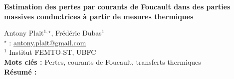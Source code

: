 


    \newpage


%
\begin{flushleft}
\addtocounter{section}{1}
{\Large \textbf{Estimation des pertes par courants de Foucault dans des parties massives conductrices à partir de mesures thermiques}}\label{ref:9}
\end{flushleft}
%
Antony Plait$^{1,\star}$, Frédéric Dubas$^{1}$\\[2mm]
$^{\star}$ \Letter : \url{antony.plait@gmail.com}\\[2mm]
{\footnotesize $^{1}$ Institut FEMTO-ST, UBFC}\\
[4mm]
%
\noindent \textbf{Mots clés : } Pertes, courants de Foucault, transferts thermiques\\[4mm]
%
\noindent \textbf{Résumé : } 

